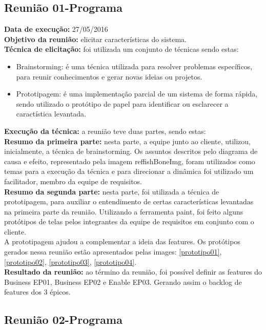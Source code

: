 \subsection{Reunião 01-Programa}
    \indent \textbf{Data de execução:} 27/05/2016\\
    \indent \textbf{Objetivo da reunião:} elicitar características do sistema.\\
    \indent \textbf{Técnica de elicitação:} foi utilizada um conjunto de técnicas sendo estas:
    \begin{itemize}
        \item Brainstorming: é uma técnica utilizada para resolver problemas específicos, para reunir conhecimentos e gerar novas ideias ou projetos.
        \item Prototipagem: é uma implementação parcial de um sistema de forma rápida, sendo utilizado o protótipo de papel para identificar ou esclarecer a caractística levantada.
    \end{itemize}
    \indent \indent \textbf{Execução da técnica:} a reunião teve duas partes, sendo estas:\\
    \indent \textbf{Resumo da primeira parte:} nesta parte, a equipe junto ao cliente, utilizou, inicialmente, a técnica de brainstorming. Os assuntos descritos pelo diagrama de causa e efeito, representado pela imagem ref{fishBoneImg}, foram utilizados como temas para a execução da técnica e para direcionar a dinâmica foi utilizado um facilitador, membro da equipe de requisitos.\\
    \indent \textbf{Resumo da segunda parte:} nesta parte, foi utilizada a técnica de prototipagem, para auxiliar o entendimento de certas características levantadas na primeira parte da reunião. Utilizando a ferramenta paint, foi feito alguns protótipos de telas pelos integrantes da equipe de requisitos em conjunto com o cliente.\\
    A prototipagem ajudou a complementar a ideia das features. Os protótipos gerados nessa reunião estão apresentados pelas images:  \ref{prototipo01}, \ref{prototipo02}, \ref{prototipo03}, \ref{prototipo04}.\\
    \indent \textbf{Resultado da reunião:} ao término da reunião, foi possível definir as features do Business EP01, Business EP02 e Enable EP03. Gerando assim o backlog de features dos 3 épicos.\\

\subsection{Reunião 02-Programa}

